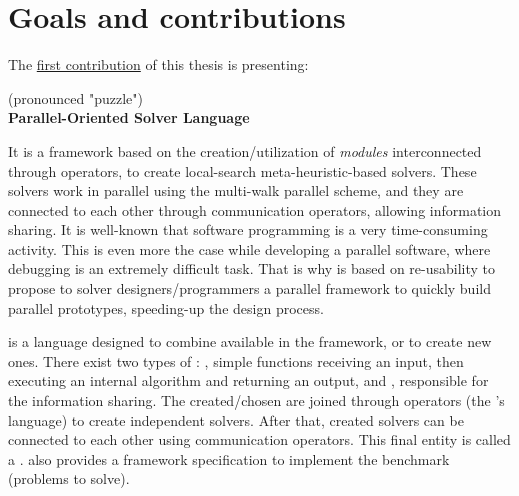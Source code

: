 \section{Goals and contributions}

The \underline{first contribution} of this thesis is presenting: 
\begin{center}
\posl{} (pronounced "puzzle")\\
\textbf{Parallel-Oriented Solver Language}
\end{center}
It is a framework based on the creation/utilization of \textit{modules} interconnected through operators, to create local-search meta-heuristic-based solvers. These solvers work in parallel using the multi-walk parallel scheme, and they are connected to each other through communication operators, allowing information sharing. It is well-known that software programming is a very time-consuming activity. This is even more the case while developing a parallel software, where debugging is an extremely difficult task. That is why \posl{} is based on re-usability to propose to \csp{} solver designers/programmers a parallel framework to quickly build parallel prototypes, speeding-up the design process.

\posl{} is a language designed to combine \ms{} available in the framework, or to create new ones. There exist two types of \ms{}: \oms{}, simple functions receiving an input, then executing an internal algorithm and returning an output, and \opchs{}, responsible for the information sharing.
The created/chosen \ms{} are joined through operators (the \posl's language) to create independent solvers. After that, created solvers can be connected to each other using communication operators. This final entity is called a \soset. \posl{} also provides a framework specification to implement the benchmark (problems to solve). %


